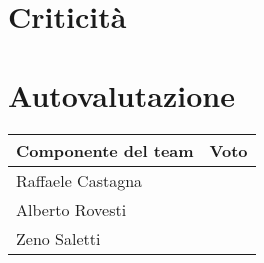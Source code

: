 \documentclass[11pt, a4paper]{article}
\theoremstyle{definition}
\begin{document}
\section{Criticità}
\section{Autovalutazione}
\begin{center}
  \footnotesize
  \begin{tabularx}{\columnwidth}{|X||c|}
      \hline
      \cellcolor{red!70}Componente del team & \cellcolor{red!70}Voto\\
      \hline
      Raffaele Castagna & \\
      \hline
      Alberto Rovesti & \\
      \hline
      Zeno Saletti & \\
      \hline
  \end{tabularx}
\end{center}
\end{document}
